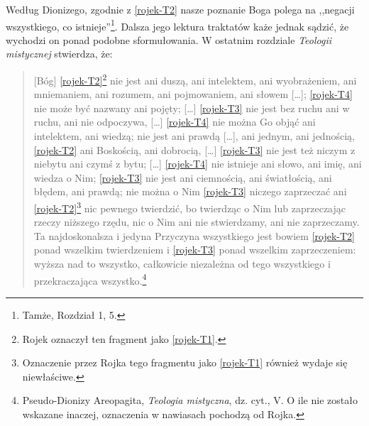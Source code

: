 Według Dionizego, zgodnie z \eqref{rojek-T2} nasze poznanie Boga polega na ,,negacji
wszystkiego, co istnieje''\footnote{Tamże, Rozdział 1, 5. }.
Dalsza jego lektura traktatów każe jednak sądzić, że wychodzi on ponad podobne sformułowania. W ostatnim
rozdziale \textit{Teologii mistycznej} stwierdza, że:

\begin{quote}
    [Bóg] \eqref{rojek-T2}\footnote{Rojek oznaczył ten fragment jako \eqref{rojek-T1}.} nie
jest ani duszą, ani intelektem, ani wyobrażeniem, ani mniemaniem, ani
rozumem, ani pojmowaniem, ani słowem […]; \eqref{rojek-T4} nie może być nazwany ani
pojęty; […] \eqref{rojek-T3} nie jest bez ruchu ani w ruchu, ani nie odpoczywa, […]
\eqref{rojek-T4} nie można Go objąć ani intelektem, ani wiedzą; nie jest ani prawdą
[…], ani jednym, ani jednością, \eqref{rojek-T2} ani Boskością, ani dobrocią, […]
\eqref{rojek-T3} nie jest też niczym z niebytu ani czymś z bytu; […] \eqref{rojek-T4} nie
istnieje ani słowo, ani imię, ani wiedza o Nim; \eqref{rojek-T3} nie jest ani
ciemnością, ani światłością, ani błędem, ani prawdą; nie można o Nim
\eqref{rojek-T3} niczego zaprzeczać ani \eqref{rojek-T2}\footnote{Oznaczenie przez Rojka tego fragmentu
jako \eqref{rojek-T1} również wydaje się niewłaściwe.} nic pewnego
twierdzić, bo twierdząc o Nim lub zaprzeczając rzeczy niższego rzędu,
nic o Nim ani nie stwierdzamy, ani nie zaprzeczamy. Ta najdoskonalsza i
jedyna Przyczyna wszystkiego jest bowiem \eqref{rojek-T2} ponad wszelkim
twierdzeniem i \eqref{rojek-T3} ponad wszelkim zaprzeczeniem: wyższa nad to
wszystko, całkowicie niezależna od tego wszystkiego i przekraczająca
wszystko.\footnote{Pseudo-Dionizy Areopagita, \textit{Teologia mistyczna}, dz.
cyt., V. O ile nie zostało wskazane inaczej, oznaczenia w nawiasach pochodzą od Rojka.}
\end{quote}





